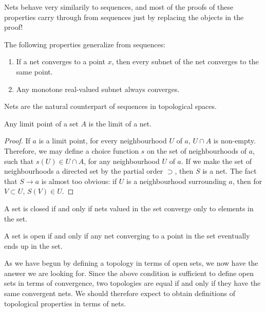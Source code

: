 Nets behave very similarily to sequences, and most of the proofs of these properties carry through from sequences just by replacing the objects in the proof!

\begin{lemma}
The following properties generalize from sequences:
\begin{enumerate}
    \item If a net converges to a point $x$, then every subnet of the net converges to the same point.
    \item Any monotone real-valued subnet always converges.
\end{enumerate}
\end{lemma}

Nets are the natural counterpart of sequences in topological spaces.

\begin{lemma}
    Any limit point of a set $A$ is the limit of a net.
\end{lemma}
\begin{proof}
    If $a$ is a limit point, for every neighbourhood $U$ of $a$, $U \cap A$ is non-empty. Therefore, we may define a choice function $s$ on the set of neighbourhoods of $a$, such that $s(U) \in U \cap A$, for any neighbourhood $U$ of $a$. If we make the set of neighbourhoods a directed set by the partial order $\supset$, then $S$ is a net. The fact that $S \to a$ is almost too obvious: if $U$ is a neighbourhood surrounding $a$, then for $V \subset U$, $S(V) \in U$.
\end{proof}

\begin{corollary}
    A set is closed if and only if nets valued in the set converge only to elements in the set.
\end{corollary}

\begin{corollary}
    A set is open if and only if any net converging to a point in the set eventually ends up in the set.
\end{corollary}

As we have begun by defining a topology in terms of open sets, we now have the answer we are looking for. Since the above condition is sufficient to define open sets in terms of convergence, two topologies are equal if and only if they have the same convergent nets. We should therefore expect to obtain definitions of topological properties in terms of nets.

